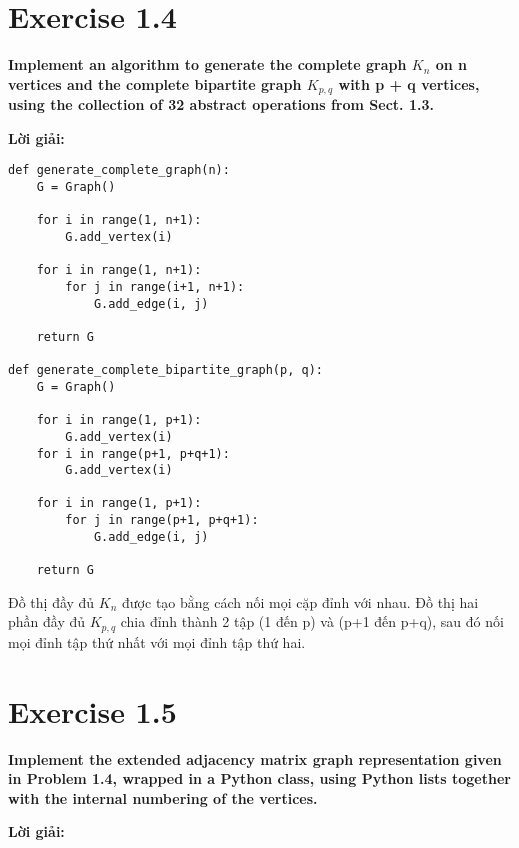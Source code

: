 \documentclass[12pt]{article}
\begin{document}
\section{Exercise 1.4}
\textbf{Implement an algorithm to generate the complete graph $K_n$ on n vertices and the complete bipartite graph $K_{p,q}$ with p + q vertices, using the collection of 32 abstract operations from Sect. 1.3.}

\textbf{Lời giải:}

\begin{lstlisting}
def generate_complete_graph(n):
    G = Graph()
    
    for i in range(1, n+1):
        G.add_vertex(i)
    
    for i in range(1, n+1):
        for j in range(i+1, n+1):
            G.add_edge(i, j)
    
    return G

def generate_complete_bipartite_graph(p, q):
    G = Graph()
    
    for i in range(1, p+1):
        G.add_vertex(i)
    for i in range(p+1, p+q+1):
        G.add_vertex(i)
    
    for i in range(1, p+1):
        for j in range(p+1, p+q+1):
            G.add_edge(i, j)
    
    return G
\end{lstlisting}

Đồ thị đầy đủ $K_n$ được tạo bằng cách nối mọi cặp đỉnh với nhau. Đồ thị hai phần đầy đủ $K_{p,q}$ chia đỉnh thành 2 tập (1 đến p) và (p+1 đến p+q), sau đó nối mọi đỉnh tập thứ nhất với mọi đỉnh tập thứ hai.

\section{Exercise 1.5}
\textbf{Implement the extended adjacency matrix graph representation given in Problem 1.4, wrapped in a Python class, using Python lists together with the internal numbering of the vertices.}

\textbf{Lời giải:}
\end{document}
